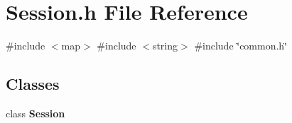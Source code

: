 \section{Session.\+h File Reference}
\label{Session_8h}
{\ttfamily \#include $<$map$>$}\newline
{\ttfamily \#include $<$string$>$}\newline
{\ttfamily \#include \char`\"{}common.\+h\char`\"{}}\newline
\subsection*{Classes}
\begin{DoxyCompactItemize}
\item 
class \textbf{ Session}
\end{DoxyCompactItemize}
